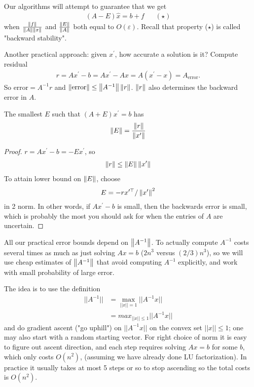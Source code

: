 \documentclass[11pt]{article}
\numberwithin{equation}{section}
\begin{document}
Our algorithms will attempt to guarantee that we get \begin{align*}
    (A-E)\hat{x} = b+f &&(\star)
\end{align*}
when $\frac{\left\| f \right\|}{\left\| A \right\|\left\| x \right\|}$ and $\frac{\left\| E \right\|}{\left\| A \right\|}$ both equal to $O(\varepsilon)$.
Recall that property ($\star$) is called "backward stability".

Another practical approach: given $x^\prime$, how accurate a solution is it? Compute residual \begin{align*}
    r = A x^\prime-b = A x^\prime-Ax = A( x^\prime-x) = A_{\mathrm{error}}.
\end{align*}
So $\mathrm{error} = A^{-1}r$ and $\left\| \mathrm{error} \right\| \leq \left\| A^{-1} \right\|\left\| r \right\|$. $\left\| r \right\|$ also determines the backward error in $A$.

\begin{theorem}
    The smallest $E$ such that $(A+E) x^\prime = b$ has \begin{align*}
        \left\| E \right\| = \frac{\left\| r \right\|}{\left\| x^\prime \right\|}
    \end{align*}
    \begin{proof}
        $r = A x^\prime - b = -E x^\prime$, so
        \begin{align*}
         \left\| r \right\| \leq \left\| E \right\|\left\| x^\prime \right\|
        \end{align*} 
        To attain lower bound on $\left\| E \right\|$, choose \begin{align*}
            E = -r x^{\prime \top}/\left\| x^\prime \right\|^2
        \end{align*} in 2 norm. In other words, if $A x^\prime-b$ is small, 
        then the backwards error is small, which is probably the most you should ask for when the entries of $A$ are uncertain. 
    \end{proof}
\end{theorem}

All our practical error bounds depend on $\left\| A^{-1} \right\|$. To actually compute $A^{-1}$ costs several times as much as just solving $Ax=b$ ($2n^3$ versus $(2/3)n^3$),
so we will use cheap estimates of $\left\| A^{-1} \right\|$ that avoid computing $A^{-1}$ explicitly, and work with small probability of large error.

The idea is to use the definition \begin{align*}
    || A^{-1} || &= \max_{||x|| = 1} || A^{-1}x || \\
    &= max_{||x||\leq 1} || A^{-1}x ||
\end{align*}
and do gradient ascent ("go uphill") on $|| A^{-1}x ||$ on the convex set $||x|| \leq 1$; one may also start with a random starting vector. 
For right choice of norm it is easy to figure out ascent direction, and each step requires solving $Ax=b$ for some $b$, which only costs $O(n^2)$, 
(assuming we have already done LU factorization). In practice it usually takes at most 5 steps or so to stop ascending so the total costs is $O(n^2)$.
\end{document}
